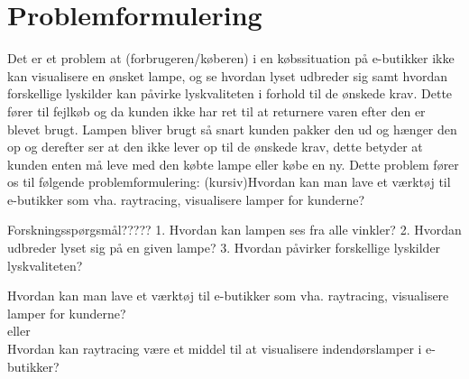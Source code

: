 \section{Problemformulering}
Det er et problem at (forbrugeren/køberen) i en købssituation på e-butikker ikke kan visualisere en ønsket lampe, og se hvordan lyset udbreder sig samt hvordan forskellige lyskilder kan påvirke lyskvaliteten i forhold til de ønskede krav. Dette fører til fejlkøb og da kunden ikke har ret til at returnere varen efter den er blevet brugt. Lampen bliver brugt så snart kunden pakker den ud og hænger den op og derefter ser at den ikke lever op til de ønskede krav, dette betyder at kunden enten må leve med den købte lampe eller købe en ny. 
Dette problem fører os til følgende problemformulering: (kursiv)Hvordan kan man lave et værktøj til e-butikker som vha. raytracing, visualisere lamper for kunderne?

Forskningsspørgsmål?????
1. Hvordan kan lampen ses fra alle vinkler?
2. Hvordan udbreder lyset sig på en given lampe?
3. Hvordan påvirker forskellige lyskilder lyskvaliteten?






Hvordan kan man lave et værktøj til e-butikker som vha. raytracing, visualisere lamper for kunderne?
\\eller\\
Hvordan kan raytracing være et middel til at visualisere indendørslamper i e-butikker?
